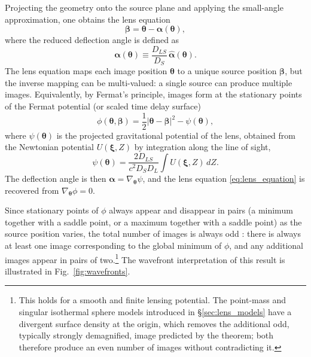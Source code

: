 Projecting the geometry onto the source plane and applying the small-angle approximation, one obtains the lens equation
\begin{equation}
    \boldsymbol{\beta} = \boldsymbol{\theta} - 
    \boldsymbol{\alpha}(\boldsymbol{\theta}),
    \label{eq:lens_equation}
\end{equation}
where the reduced deflection angle is defined as
\begin{equation}
    \boldsymbol{\alpha}(\boldsymbol{\theta}) \equiv 
    \frac{D_{LS}}{D_S}\,\hat{\boldsymbol{\alpha}}(\boldsymbol{\theta}).
\end{equation}
The lens equation maps each image position $\boldsymbol{\theta}$ to a unique source position $\boldsymbol{\beta}$, but the inverse mapping can be multi-valued: a single source can produce multiple images. Equivalently, by Fermat's principle, images form at the stationary points of the Fermat potential (or scaled time delay surface)
\begin{equation}
    \phi(\boldsymbol{\theta}, \boldsymbol{\beta}) =
    \frac{1}{2}|\boldsymbol{\theta} - \boldsymbol{\beta}|^2
    - \psi(\boldsymbol{\theta}),
    \label{eq:fermat_potential}
\end{equation}
where $\psi(\boldsymbol{\theta})$ is the projected gravitational potential of the lens, obtained from the Newtonian potential $U(\boldsymbol{\xi},Z)$ by integration along the line of sight,
\begin{equation}
    \psi(\boldsymbol{\theta}) =
    \frac{2D_{LS}}{c^2 D_S D_L}
    \int U(\boldsymbol{\xi}, Z)\,dZ.
\end{equation}
The deflection angle is then $\boldsymbol{\alpha} = 
\nabla_{\boldsymbol{\theta}}\psi$, and the lens equation 
\eqref{eq:lens_equation} is recovered from $\nabla_{\boldsymbol{\theta}}\phi = 0$.

Since stationary points of $\phi$ always appear and disappear in pairs (a minimum together with a saddle point, or a maximum together with a saddle point) as the source position varies, the total number of images is always odd \cite{odd_theorem}: there is always at least one image corresponding to the global minimum of $\phi$, and any additional images appear in pairs of two.\footnote{This holds for a smooth and finite lensing potential. The point-mass and singular isothermal sphere models introduced in \S\ref{sec:lens_models} have a divergent surface density at the origin, which removes the additional odd, typically strongly demagnified, image predicted by the theorem; both therefore produce an even number of images without contradicting it.} The wavefront interpretation of this result is illustrated in Fig.~\ref{fig:wavefronts}.


